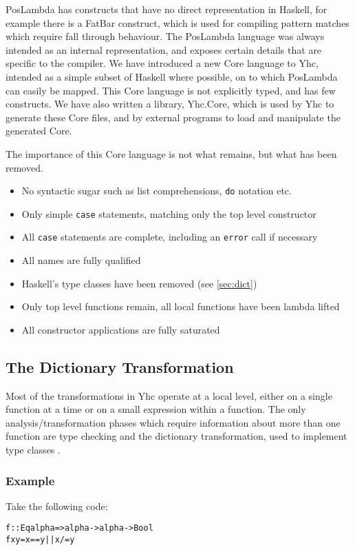 \documentclass[preprint]{sigplanconf}
\newcommand{\T}[1]{\texttt{#1}}
\newcounter{exmp}
\newcommand{\yesexample}{\subsubsection*{Example \arabic{exmp}}\addtocounter{exmp}{1}}
\newenvironment{code}{\begin{alltt}\small}{\end{alltt}}
\begin{document}
PosLambda has constructs that have no direct representation in Haskell, for example there is a FatBar construct, which is used for compiling pattern matches which require fall through behaviour. The PosLambda language was always intended as an internal representation, and exposes certain details that are specific to the compiler. We have introduced a new Core language to Yhc, intended as a simple subset of Haskell where possible, on to which PosLambda can easily be mapped. This Core language is not explicitly typed, and has few constructs. We have also written a library, Yhc.Core, which is used by Yhc to generate these Core files, and by external programs to load and manipulate the generated Core.

The importance of this Core language is not what remains, but what has been removed.

\begin{itemize}
\item No syntactic sugar such as list comprehensions, \T{do} notation etc.
\item Only simple \T{case} statements, matching only the top level constructor
\item All \T{case} statements are complete, including an \T{error} call if necessary
\item All names are fully qualified
\item Haskell's type classes have been removed (see \ref{sec:dict})
\item Only top level functions remain, all local functions have been lambda lifted
\item All constructor applications are fully saturated
\end{itemize}

\subsection{The Dictionary Transformation}

Most of the transformations in Yhc operate at a local level, either on a single function at a time or on a small expression within a function. The only analysis/transformation phases which require information about more than one function are type checking and the dictionary transformation, used to implement type classes \citep{wadler:type_classes}.

\yesexample

Take the following code:

\begin{code}
f :: Eq alpha => alpha -> alpha -> Bool
f x y = x == y || x /= y
\end{code}
\end{document}
